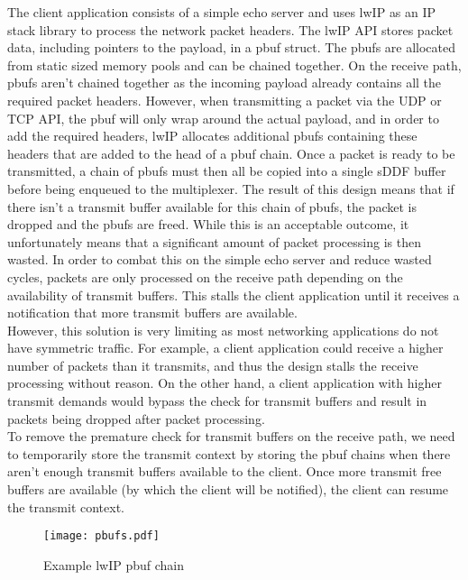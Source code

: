 The client application consists of a simple echo server and uses lwIP \cite{Dunkels_01} as an IP
stack library to process the network packet headers. The lwIP API stores packet data, including pointers
to the payload, in a pbuf struct. The pbufs are allocated from static sized memory pools and can be chained
together. On the receive path, pbufs aren't chained together as the incoming payload already contains
all the required packet headers. However, when transmitting a packet via the UDP or TCP API, the pbuf will
only wrap around the actual payload, and in order to add the required headers, lwIP allocates additional pbufs
containing these headers that are added to the head of a pbuf chain. Once a packet is ready to be transmitted,
a chain of pbufs must then all be copied into a single sDDF buffer before being enqueued to the multiplexer.
The result of this design means that if there isn't a transmit buffer available for this chain of pbufs, the
packet is dropped and the pbufs are freed. While this is an acceptable outcome, it unfortunately means that a significant
amount of packet processing is then wasted. In order to combat this on the simple echo server and reduce
wasted cycles, packets are only
processed on the receive path depending on the availability of transmit buffers. This stalls the client application
until it receives a notification that more transmit buffers are available. \\
However, this solution is very limiting
as most networking applications do not have symmetric traffic. For example, a client application could receive a
higher number of packets than it transmits, and thus the design stalls the receive processing without reason. 
On the other hand, a client application with higher transmit demands would bypass the check for transmit buffers and result in
packets being dropped after packet processing. \\
To remove the premature check for transmit buffers on the receive path, we need to 
temporarily store the transmit context by storing the pbuf chains when there aren't enough transmit buffers
available to the client. Once more transmit free buffers are available (by which the client will be notified),
the client can resume the transmit context. 

\begin{figure}[h]
    \centering
    \texttt{[image: pbufs.pdf]}
    \caption{Example lwIP pbuf chain}
    \label{f:pbufs}
\end{figure}


